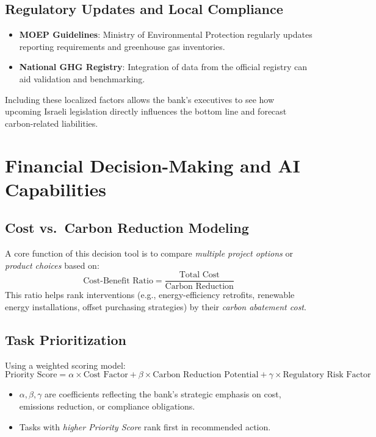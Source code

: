 \documentclass[12pt]{article}
\begin{document}
\subsection{Regulatory Updates and Local Compliance}
\begin{itemize}
    \item \textbf{MOEP Guidelines}: Ministry of Environmental Protection regularly updates 
    reporting requirements and greenhouse gas inventories.
    \item \textbf{National GHG Registry}: Integration of data from the official registry 
    can aid validation and benchmarking.
\end{itemize}

Including these localized factors allows the bank's executives 
to see how upcoming Israeli legislation directly influences the bottom line 
and forecast carbon-related liabilities.

\section{Financial Decision-Making and AI Capabilities}
\label{sec:financial-decision-ai}

\subsection{Cost vs.\ Carbon Reduction Modeling}
A core function of this decision tool is to compare \emph{multiple project options} or 
\emph{product choices} based on:
\[
  \text{Cost-Benefit Ratio} = \frac{\text{Total Cost}}{\text{Carbon Reduction}}
\]
This ratio helps rank interventions (e.g., energy-efficiency retrofits, 
renewable energy installations, offset purchasing strategies) 
by their \emph{carbon abatement cost}.

\subsection{Task Prioritization}
Using a weighted scoring model:
\begin{equation}
  \text{Priority Score} = \alpha \times \text{Cost Factor} 
                         + \beta \times \text{Carbon Reduction Potential} 
                         + \gamma \times \text{Regulatory Risk Factor}
\end{equation}
\begin{itemize}
    \item \(\alpha, \beta, \gamma\) are coefficients reflecting the bank's strategic emphasis 
    on cost, emissions reduction, or compliance obligations.
    \item Tasks with \emph{higher Priority Score} rank first in recommended action.
\end{itemize}
\end{document}
